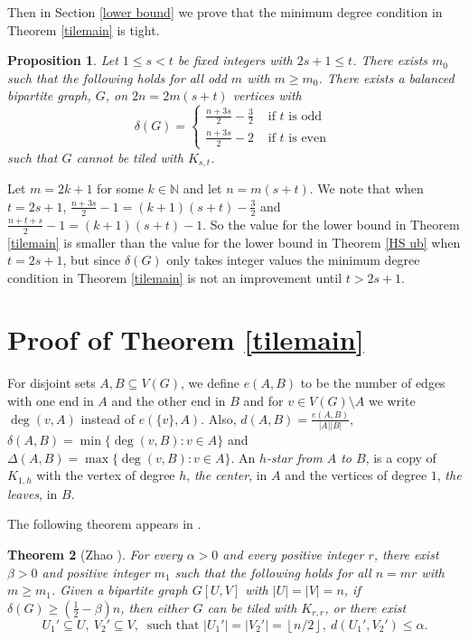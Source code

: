 \documentclass[oneside,12pt]{memoir}
\newtheorem{theorem}{Theorem}[section]
\newtheorem{proposition}[theorem]{Proposition}
\newcommand{\floor}[1]{\left\lfloor#1\right\rfloor}
\newcommand{\half}{\frac{1}{2}}
\begin{document}
Then in Section \ref{lower bound} we prove that the minimum degree condition in Theorem \ref{tilemain} is tight.

\begin{proposition}\label{counterexample}
Let $1\leq s<t$ be fixed integers with $2s+1\leq t$.  There exists $m_0$ such that the following holds for all odd $m$ with $m\geq m_0$. There exists a balanced bipartite graph, $G$, on $2n=2m(s+t)$ vertices with 
$$\delta(G)= \left\lbrace \begin{array}{ll}\frac{n+3s}{2}-\frac{3}{2}   & \text{ if } t \text{ is odd } \\
              \frac{n+3s}{2}-2 & \text{ if } t \text{ is even } \end{array} \right. $$
such that $G$ cannot be tiled with $K_{s,t}$.
\end{proposition}

Let $m=2k+1$ for some $k\in\mathbb{N}$ and let $n=m(s+t)$.  We note that when $t=2s+1$, $\frac{n+3s}{2}-1=(k+1)(s+t)-\frac{3}{2}$ and $\frac{n+t+s}{2}-1=(k+1)(s+t)-1$.  So the value for the lower bound in Theorem \ref{tilemain} is smaller than the value for the lower bound in Theorem \ref{HS ub} when $t=2s+1$, but since $\delta(G)$ only takes integer values the minimum degree condition in Theorem \ref{tilemain} is not an improvement until $t>2s+1$.


\section{Proof of Theorem \ref{tilemain}} 

For disjoint sets $A,B\subseteq V(G)$, we define $e(A,B)$ to be the number of edges with one end in $A$ and the other end in $B$ and for $v\in V(G)\setminus A$ we write $\deg(v,A)$ instead of $e(\{v\},A)$.  Also, $d(A,B)=\frac{e(A,B)}{|A||B|}$, $\delta(A,B)=\min\{\deg(v,B):v\in A\}$ and $\Delta(A,B)=\max\{\deg(v,B):v\in A\}$.  An \emph{$h$-star from $A$ to $B$}, is a copy of $K_{1,h}$ with the vertex of degree $h$, \emph{the center}, in $A$ and the vertices of degree $1$, \emph{the leaves}, in $B$.

The following theorem appears in \cite{Z}.

\begin{theorem}[Zhao \cite{Z}]\label{stability}
For every $\alpha>0$ and every positive integer $r$, there exist $\beta>0$ and positive integer $m_1$ such that the following holds for all $n=mr$ with $m\geq m_1$.  Given a bipartite graph $G[U,V]$ with $|U|=|V|=n$, if $\delta(G)\geq (\half-\beta)n$, then either $G$ can be tiled with $K_{r,r}$, or there exist \begin{equation}\label{extremalcondition} U_1'\subseteq U,~ V_2'\subseteq V,~\text{ such that } |U_1'|=|V_2'|=\floor{n/2},~ d(U_1',V_2')\leq \alpha.\end{equation}
\end{theorem}
\end{document}
